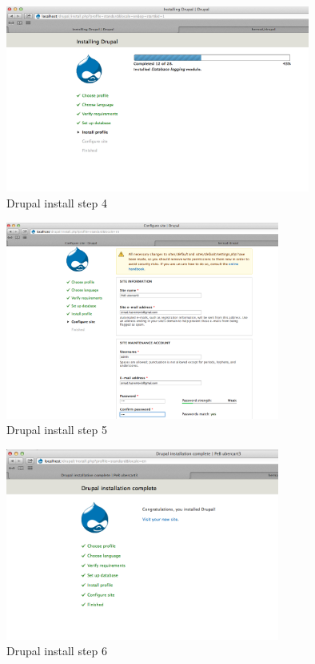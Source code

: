 \documentclass[times, utf8, seminar]{fit}
\begin{document}
{{{\begin{figure}[H]
\centering
\includegraphics[width=10cm]{img/drupal_install_4.png}
\caption{Drupal install step 4}
\end{figure}

\begin{figure}[H]
\centering
\includegraphics[width=9cm]{img/drupal_install_5.png}
\caption{Drupal install step 5}
\end{figure}

\begin{figure}[H]
\centering
\includegraphics[width=9cm]{img/drupal_install_6.png}
\caption{Drupal install step 6}
\end{figure}


}}}
\end{document}
